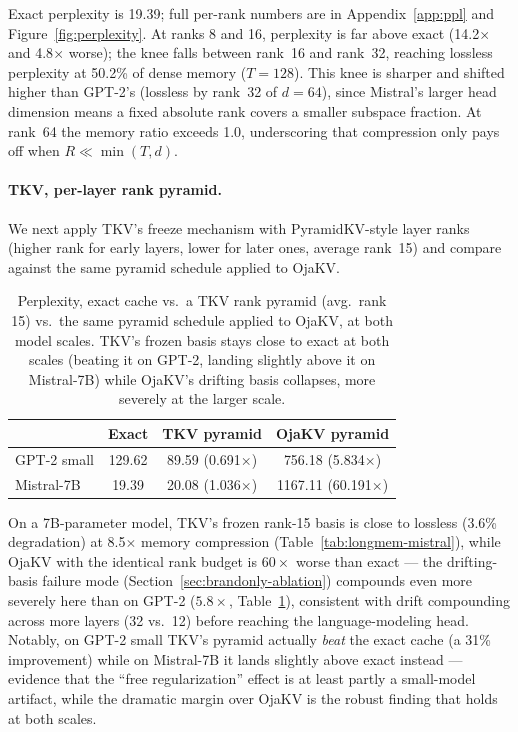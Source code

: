 \documentclass{article}
\begin{document}
Exact perplexity is 19.39; full per-rank numbers are in
Appendix~\ref{app:ppl} and Figure~\ref{fig:perplexity}.
At ranks 8 and 16, perplexity is far above exact (14.2$\times$ and
4.8$\times$ worse); the knee falls between rank~16 and rank~32, reaching
lossless perplexity at 50.2\% of dense memory ($T=128$).  This knee is
sharper and shifted higher than GPT-2's (lossless by rank~32 of $d=64$),
since Mistral's larger head dimension means a fixed absolute rank covers a
smaller subspace fraction.  At rank~64 the memory ratio exceeds 1.0,
underscoring that compression only pays off when $R \ll \min(T, d)$.

\paragraph{TKV, per-layer rank pyramid.}  We next apply TKV's freeze
mechanism with PyramidKV-style layer ranks (higher rank for early layers,
lower for later ones, average rank~15) and compare against the same pyramid
schedule applied to OjaKV.

\begin{table}[t]
\centering
\caption{Perplexity, exact cache vs.\ a TKV rank pyramid (avg.\ rank 15)
vs.\ the same pyramid schedule applied to OjaKV, at both model scales.
TKV's frozen basis stays close to exact at both scales (beating it on
GPT-2, landing slightly above it on Mistral-7B) while OjaKV's drifting
basis collapses, more severely at the larger scale.}
\label{tab:ppl-pyramid}
\small
\begin{tabular}{lccc}
\toprule
& Exact & TKV pyramid & OjaKV pyramid \\
\midrule
GPT-2 small & 129.62 & 89.59 (0.691$\times$) & 756.18 (5.834$\times$) \\
Mistral-7B & 19.39 & 20.08 (1.036$\times$) & 1167.11 (60.191$\times$) \\
\bottomrule
\end{tabular}
\normalsize
\end{table}

On a 7B-parameter model, TKV's frozen rank-15 basis is close to lossless
(3.6\% degradation) at 8.5$\times$ memory compression
(Table~\ref{tab:longmem-mistral}), while OjaKV with the identical rank
budget is $60\times$ worse than exact --- the drifting-basis failure mode
(Section~\ref{sec:brandonly-ablation}) compounds even more severely here
than on GPT-2 ($5.8\times$, Table~\ref{tab:ppl-pyramid}), consistent with
drift compounding across more layers (32 vs.\ 12) before reaching the
language-modeling head.  Notably, on GPT-2 small TKV's pyramid actually
\emph{beat} the exact cache (a 31\% improvement) while on Mistral-7B it
lands slightly above exact instead --- evidence that the ``free
regularization'' effect is at least partly a small-model artifact, while
the dramatic margin over OjaKV is the robust finding that holds at both
scales.
\end{document}
